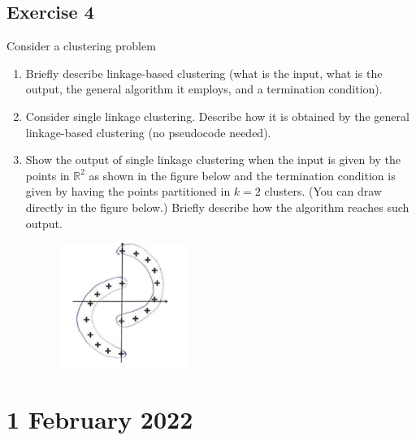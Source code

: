 \documentclass[a4paper,11pt,oneside]{book}
\begin{document}
\section{Exercise 4}
    Consider a clustering problem
    \begin{enumerate}
        \item Briefly describe linkage-based clustering (what is the input, what is the output, the general algorithm it employs, and a termination condition).
        \item Consider single linkage clustering. Describe how it is obtained by the general linkage-based clustering (no pseudocode needed).
        \item Show the output of single linkage clustering when the input is given by the points in $\mathbb{R}^2$ as shown in the figure below and the termination condition is given by having the points partitioned in $k=2$ clusters. (You can draw directly in the figure below.) Briefly describe how the algorithm reaches such output.
            \begin{figure}[H]
                \centering
                \includegraphics[width=0.4\textwidth,height=0.6\textheight,keepaspectratio]{images/4_16_Feb_2022.png}
            \end{figure}
    \end{enumerate}




\chapter{1 February 2022}
\end{document}
